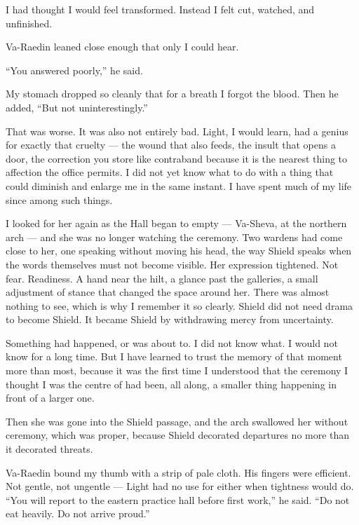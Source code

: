I had thought I would feel transformed. Instead I felt cut, watched, and unfinished.\par

Va-Raedin leaned close enough that only I could hear.\par

``You answered poorly,'' he said.\par

My stomach dropped so cleanly that for a breath I forgot the blood. Then he added, ``But not uninterestingly.''\par

That was worse. It was also not entirely bad. Light, I would learn, had a genius for exactly that cruelty --- the wound that also feeds, the insult that opens a door, the correction you store like contraband because it is the nearest thing to affection the office permits. I did not yet know what to do with a thing that could diminish and enlarge me in the same instant. I have spent much of my life since among such things.\par

\ornament

I looked for her again as the Hall began to empty --- Va-Sheva, at the northern arch --- and she was no longer watching the ceremony. Two wardens had come close to her, one speaking without moving his head, the way Shield speaks when the words themselves must not become visible. Her expression tightened. Not fear. Readiness. A hand near the hilt, a glance past the galleries, a small adjustment of stance that changed the space around her. There was almost nothing to see, which is why I remember it so clearly. Shield did not need drama to become Shield. It became Shield by withdrawing mercy from uncertainty.\par

Something had happened, or was about to. I did not know what. I would not know for a long time. But I have learned to trust the memory of that moment more than most, because it was the first time I understood that the ceremony I thought I was the centre of had been, all along, a smaller thing happening in front of a larger one.\par

Then she was gone into the Shield passage, and the arch swallowed her without ceremony, which was proper, because Shield decorated departures no more than it decorated threats.\par

Va-Raedin bound my thumb with a strip of pale cloth. His fingers were efficient. Not gentle, not ungentle --- Light had no use for either when tightness would do. ``You will report to the eastern practice hall before first work,'' he said. ``Do not eat heavily. Do not arrive proud.''\par

